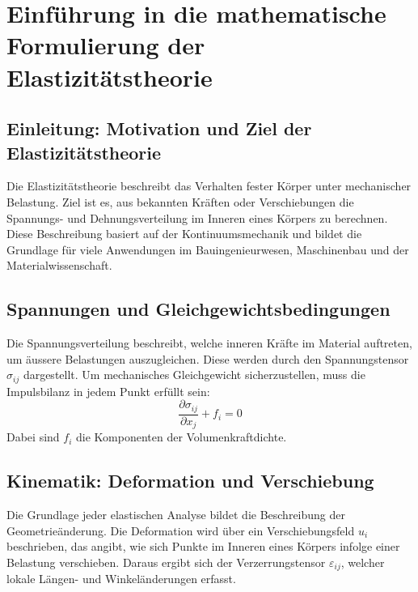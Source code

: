%
%
%
%
\section{Einführung in die mathematische Formulierung der Elastizitätstheorie}
\subsection{Einleitung: Motivation und Ziel der Elastizitätstheorie}
Die Elastizitätstheorie beschreibt das Verhalten fester Körper unter mechanischer Belastung. 
Ziel ist es, aus bekannten Kräften oder Verschiebungen die Spannungs- und Dehnungsverteilung im Inneren eines Körpers zu berechnen. 
Diese Beschreibung basiert auf der Kontinuumsmechanik und bildet die Grundlage für viele Anwendungen im Bauingenieurwesen, Maschinenbau und der Materialwissenschaft.

\subsection{Spannungen und Gleichgewichtsbedingungen}
Die Spannungsverteilung beschreibt, welche inneren Kräfte im Material auftreten, um äussere Belastungen auszugleichen. 
Diese werden durch den Spannungstensor $\sigma_{ij}$ dargestellt. 
Um mechanisches Gleichgewicht sicherzustellen, muss die Impulsbilanz in jedem Punkt erfüllt sein:
\begin{equation}
	\frac{\partial \sigma_{ij}}{\partial x_j} + f_i = 
	0
\end{equation}
Dabei sind $f_i$ die Komponenten der Volumenkraftdichte.

\subsection{Kinematik: Deformation und Verschiebung}
Die Grundlage jeder elastischen Analyse bildet die Beschreibung der Geometrieänderung. 
Die Deformation wird über ein Verschiebungsfeld $u_i$ beschrieben, das angibt, wie sich Punkte im Inneren eines Körpers infolge einer Belastung verschieben. 
Daraus ergibt sich der Verzerrungstensor $\varepsilon_{ij}$, welcher lokale Längen- und Winkeländerungen erfasst.

